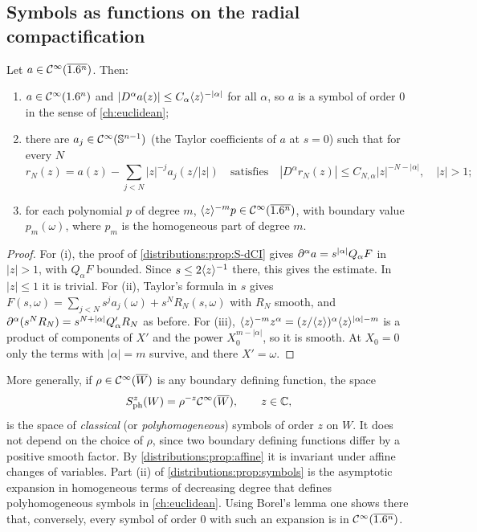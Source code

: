 \subsection{Symbols as functions on the radial compactification}
\begin{proposition}\label{distributions:prop:symbols}
Let $a\in\mathcal{C}^\infty(\overline{1.6^n})$. Then:
\begin{enumerate}[label=(\roman*)]
\item $a\in\mathcal{C}^\infty(1.6^n)$ and $|D^\alpha a(z)|\le C_\alpha\langle z\rangle^{-|\alpha|}$ for all
  $\alpha$, so $a$ is a symbol of order $0$ in the sense of \cref{ch:euclidean};
\item there are $a_j\in\mathcal{C}^\infty(\mathbb{S}^{n-1})$ (the Taylor coefficients of $a$ at $s=0$)
  such that for every $N$
  \[
    r_N(z)=a(z)-\sum_{j<N}|z|^{-j}a_j(z/|z|)\quad\text{satisfies}\quad
    |D^\alpha r_N(z)|\le C_{N,\alpha}|z|^{-N-|\alpha|},\quad|z|>1;
  \]
\item for each polynomial $p$ of degree $m$, $\langle z\rangle^{-m}p\in\mathcal{C}^\infty(\overline{1.6^n})$, with
  boundary value $p_m(\omega)$, where $p_m$ is the homogeneous part of degree $m$.
\end{enumerate}
\end{proposition}
\begin{proof}
For (i), the proof of \cref{distributions:prop:S-dCI} gives
$\partial^\alpha a=s^{|\alpha|}Q_\alpha F$ in $|z|>1$, with $Q_\alpha F$ bounded. Since
$s\le2\langle z\rangle^{-1}$ there, this gives the estimate. In $|z|\le1$ it is trivial.
For (ii), Taylor's formula in $s$ gives
$F(s,\omega)=\sum_{j<N}s^ja_j(\omega)+s^NR_N(s,\omega)$ with $R_N$ smooth, and
$\partial^\alpha(s^NR_N)=s^{N+|\alpha|}Q'_\alpha R_N$ as before. For (iii),
$\langle z\rangle^{-m}z^\alpha=(z/\langle z\rangle)^\alpha\langle z\rangle^{|\alpha|-m}$ is a product of components
of $X'$ and the power $X_0^{m-|\alpha|}$, so it is smooth. At $X_0=0$ only the terms with
$|\alpha|=m$ survive, and there $X'=\omega$.
\end{proof}

More generally, if $\rho\in\mathcal{C}^\infty(\overline{W})$ is any boundary defining function, the space
\[
  S^{z}_{\mathrm{ph}}(W)=\rho^{-z}\mathcal{C}^\infty(\overline{W}),\qquad z\in\mathbb{C},
\]
is the space of \emph{classical} (or \emph{polyhomogeneous}) symbols of order $z$ on
$W$. It does not depend on the choice of $\rho$, since two boundary defining functions
differ by a positive smooth factor. By \cref{distributions:prop:affine} it is invariant
under affine changes of variables. Part (ii) of \cref{distributions:prop:symbols} is the
asymptotic expansion in homogeneous terms of decreasing degree that defines
polyhomogeneous symbols in \cref{ch:euclidean}. Using Borel's lemma one shows there
that, conversely, every symbol of order $0$ with such an expansion is in
$\mathcal{C}^\infty(\overline{1.6^n})$.


